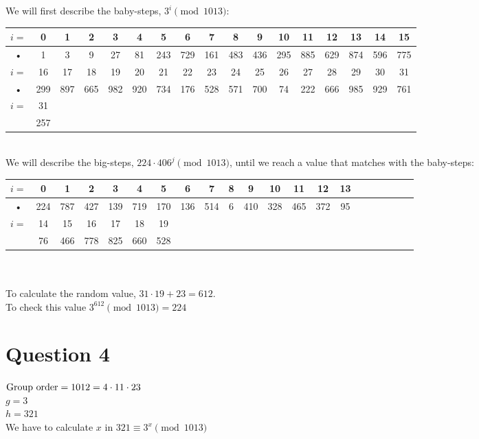 \documentclass{article}
\begin{document}
We will first describe the baby-steps, $3^i \pmod{1013}$:\\

\begin{tabular}{|c|c|c|c|c|c|c|c|c|c|c|c|c|c|c|c|c|}
\hline 
$i = $ & 0 & 1 & 2 & 3 & 4 & 5 & 6 & 7 & 8 & 9 & 10 & 11 & 12 & 13 & 14 & 15 \\ 
\hline 
• & 1 & 3 & 9 & 27 & 81 & 243 & 729 & 161 & 483 & 436 & 295 & 885 & 629 & 874 & 596 & 775 \\ 
\hline 
$i = $ & 16 & 17 & 18 & 19 & 20 & 21 & 22 & 23 & 24 & 25 & 26 & 27 & 28 & 29 & 30 & 31 \\ 
\hline 
• & 299 & 897 & 665 & 982 & 920 & 734 & 176 & 528 & 571 & 700 & 74 & 222 & 666 & 985 & 929 & 761 \\ 
\hline
$i = $ & 31 & & & & & & & & & & & & & & & \\
\hline
 	   & 257& & & & & & & & & & & & & & & \\
 \hline
\end{tabular}\\

We will describe the big-steps, $224 \cdot 406^j \pmod{1013}$, until we reach a value that matches with the baby-steps:\\

\begin{tabular}{|c|c|c|c|c|c|c|c|c|c|c|c|c|c|c|c|c|c|c|c|c|}
\hline 
$i = $ & 0 & 1 & 2 & 3 & 4 & 5 & 6 & 7 & 8 & 9 & 10 & 11 & 12 & 13 \\ 
\hline 
• & 224 & 787 & 427 & 139 & 719 & 170 & 136 & 514 & 6 & 410 & 328 & 465 & 372 & 95 \\ 
\hline 
$i = $ & 14 & 15 & 16 & 17 & 18 & 19 & & & & & & & & \\
\hline
 & 76 & 466 & 778 & 825 & 660 & 528 & & & & & & & & \\
\hline
\end{tabular}\\
\\
To calculate the random value, $31 \cdot 19 + 23 = 612$. \\
To check this value $3^{612} \pmod{1013} = 224$

\section{Question 4}

$\hbox{Group order} = 1012 = 4 \cdot 11 \cdot 23$\\
$g = 3$\\
$h = 321$\\
We have to calculate $x$ in $321 \equiv 3^x \pmod{1013}$\\
\end{document}
